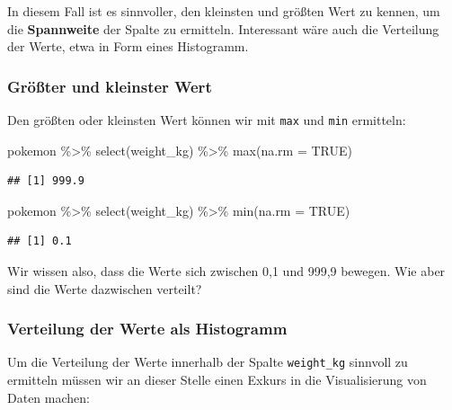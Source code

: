 \documentclass[
]{book}
\newenvironment{Shaded}{\begin{snugshade}}{\end{snugshade}}
\newcommand{\AttributeTok}[1]{\textcolor[rgb]{0.77,0.63,0.00}{#1}}
\newcommand{\ConstantTok}[1]{\textcolor[rgb]{0.00,0.00,0.00}{#1}}
\newcommand{\FunctionTok}[1]{\textcolor[rgb]{0.00,0.00,0.00}{#1}}
\newcommand{\NormalTok}[1]{#1}
\newcommand{\SpecialCharTok}[1]{\textcolor[rgb]{0.00,0.00,0.00}{#1}}
\begin{document}
In diesem Fall ist es sinnvoller, den kleinsten und größten Wert zu kennen, um die \textbf{Spannweite} der Spalte zu ermitteln. Interessant wäre auch die Verteilung der Werte, etwa in Form eines Histogramm.

\hypertarget{gruxf6uxdfter-und-kleinster-wert}{%
\subsubsection{Größter und kleinster Wert}\label{gruxf6uxdfter-und-kleinster-wert}}

Den größten oder kleinsten Wert können wir mit \texttt{max} und \texttt{min} ermitteln:

\begin{Shaded}
\begin{Highlighting}[]
\NormalTok{pokemon }\SpecialCharTok{\%\textgreater{}\%}
  \FunctionTok{select}\NormalTok{(weight\_kg) }\SpecialCharTok{\%\textgreater{}\%}
  \FunctionTok{max}\NormalTok{(}\AttributeTok{na.rm =} \ConstantTok{TRUE}\NormalTok{)}
\end{Highlighting}
\end{Shaded}

\begin{verbatim}
## [1] 999.9
\end{verbatim}

\begin{Shaded}
\begin{Highlighting}[]
\NormalTok{pokemon }\SpecialCharTok{\%\textgreater{}\%}
  \FunctionTok{select}\NormalTok{(weight\_kg) }\SpecialCharTok{\%\textgreater{}\%}
  \FunctionTok{min}\NormalTok{(}\AttributeTok{na.rm =} \ConstantTok{TRUE}\NormalTok{)}
\end{Highlighting}
\end{Shaded}

\begin{verbatim}
## [1] 0.1
\end{verbatim}

Wir wissen also, dass die Werte sich zwischen 0,1 und 999,9 bewegen. Wie aber sind die Werte dazwischen verteilt?

\hypertarget{wertebereich-intervallskaliert-histogramm}{%
\subsubsection{Verteilung der Werte als Histogramm}\label{wertebereich-intervallskaliert-histogramm}}

Um die Verteilung der Werte innerhalb der Spalte \texttt{weight\_kg} sinnvoll zu ermitteln müssen wir an dieser Stelle einen Exkurs in die Visualisierung von Daten machen:
\end{document}
